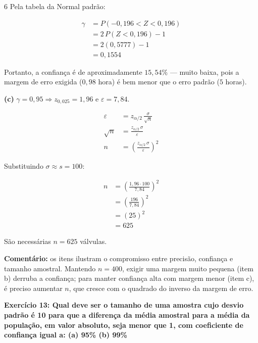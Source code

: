 \documentclass[8pt, a4paper, landscape]{extarticle}
\begin{document}
\begin{multicols}{6}
Pela tabela da Normal padrão:

\begin{equation*}
\begin{split}
\gamma &= P(-0,196 < Z < 0,196) \\
&= 2\,P(Z < 0,196) - 1 \\
&= 2(0,5777) - 1 \\
&= 0,1554
\end{split}
\end{equation*}

Portanto, a confiança é de aproximadamente $15,54\%$ — muito baixa, pois a margem de erro exigida ($0,98$ hora) é bem menor que o erro padrão ($5$ horas).

\vspace{0.2cm}

\textbf{(c)} $\gamma = 0,95 \Rightarrow z_{0,025} = 1,96$ e $\varepsilon = 7,84$.

\begin{equation*}
\begin{split}
\varepsilon &= z_{\alpha/2}\,\frac{\sigma}{\sqrt{n}} \\
\sqrt{n} &= \frac{z_{\alpha/2}\,\sigma}{\varepsilon} \\
n &= \left(\frac{z_{\alpha/2}\,\sigma}{\varepsilon}\right)^2
\end{split}
\end{equation*}

Substituindo $\sigma \approx s = 100$:

\begin{equation*}
\begin{split}
n &= \left(\frac{1,96 \cdot 100}{7,84}\right)^2 \\
&= \left(\frac{196}{7,84}\right)^2 \\
&= (25)^2 \\
&= 625
\end{split}
\end{equation*}

São necessárias $n = 625$ válvulas.

\vspace{0.2cm}

\textbf{Comentário:} os itens ilustram o compromisso entre precisão, confiança e tamanho amostral. Mantendo $n = 400$, exigir uma margem muito pequena (item b) derruba a confiança; para manter confiança alta com margem menor (item c), é preciso aumentar $n$, que cresce com o quadrado do inverso da margem de erro.

\textbf{Exercício 13: Qual deve ser o tamanho de uma amostra cujo desvio padrão é 10 para que a diferença da média amostral para a média da população, em valor absoluto, seja menor que 1, com coeficiente de confiança igual a: (a) 95\% (b) 99\%}


\end{multicols}
\end{document}
